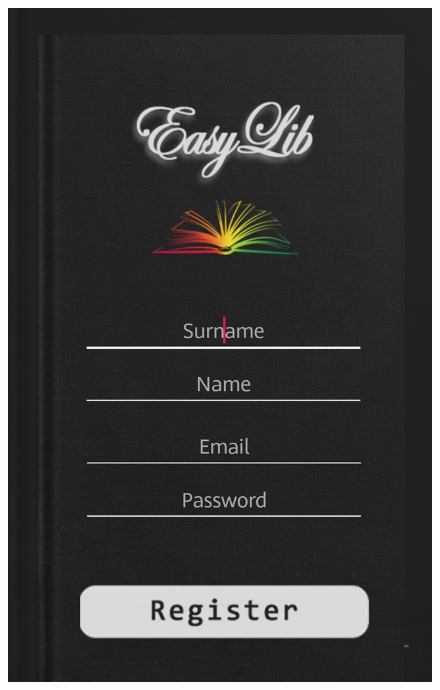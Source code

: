 \begin{figure}[H]
	\includegraphics[scale=0.15]{Images/UI/Login_Register/2}
	\hspace{0.5cm}

\end{figure}
